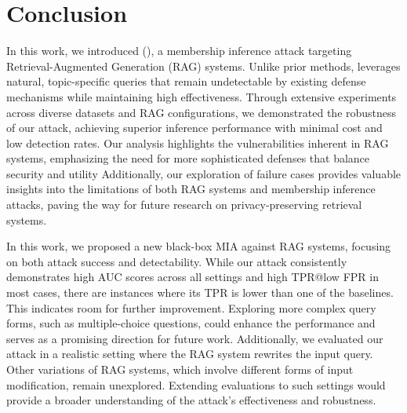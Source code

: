 \section{Conclusion}
\label{sec:conclusion}

In this work, we introduced \ourattackfull (\ourattack), a membership inference attack targeting Retrieval-Augmented Generation (RAG) systems. Unlike prior methods, \ourattack leverages natural, topic-specific queries that remain undetectable by existing defense mechanisms while maintaining high effectiveness. Through extensive experiments across diverse datasets and RAG configurations, we demonstrated the robustness of our attack, achieving superior inference performance with minimal cost and low detection rates. Our analysis highlights the vulnerabilities inherent in RAG systems, emphasizing the need for more sophisticated defenses that balance security and utility
Additionally, our exploration of failure cases provides valuable insights into the limitations of both RAG systems and membership inference attacks, paving the way for future research on privacy-preserving retrieval systems.


In this work, we proposed a new black-box MIA against RAG systems, focusing on both attack success and detectability. While our attack consistently demonstrates high AUC scores across all settings and high TPR@low FPR in most cases, there are instances where its TPR is lower than one of the baselines. This indicates room for further improvement. Exploring more complex query forms, such as multiple-choice questions, could enhance the performance and serves as a promising direction for future work.
Additionally, we evaluated our attack in a realistic setting where the RAG system rewrites the input query. Other variations of RAG systems, which involve different forms of input modification, remain unexplored. Extending evaluations to such settings would provide a broader understanding of the attack's effectiveness and robustness.

